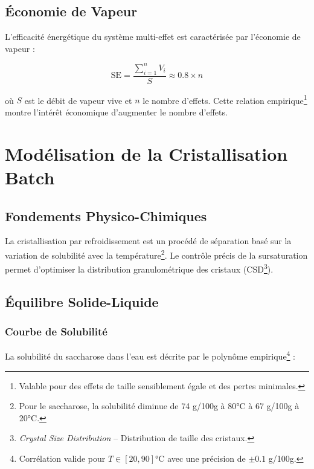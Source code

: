 \documentclass[12pt,a4paper,twoside]{article}
\begin{document}
\subsection{Économie de Vapeur}

L'efficacité énergétique du système multi-effet est caractérisée par l'économie de vapeur :

\begin{equation}
\boxed{\text{SE} = \frac{\sum_{i=1}^{n} V_i}{S} \approx 0.8 \times n}
\label{eq:steam_economy}
\end{equation}

où $S$ est le débit de vapeur vive et $n$ le nombre d'effets. Cette relation empirique\footnote{Valable pour des effets de taille sensiblement égale et des pertes minimales.} montre l'intérêt économique d'augmenter le nombre d'effets.

\section{Modélisation de la Cristallisation Batch}

\subsection{Fondements Physico-Chimiques}

\lettrine[lines=2]{L}{}a cristallisation par refroidissement est un procédé de séparation basé sur la variation de solubilité avec la température\footnote{Pour le saccharose, la solubilité diminue de 74 g/100g à 80°C à 67 g/100g à 20°C.}. Le contrôle précis de la sursaturation permet d'optimiser la distribution granulométrique des cristaux (CSD\footnote{\textit{Crystal Size Distribution} -- Distribution de taille des cristaux.}).

\subsection{Équilibre Solide-Liquide}

\subsubsection{Courbe de Solubilité}

La solubilité du saccharose dans l'eau est décrite par le polynôme empirique\footnote{Corrélation valide pour $T \in [20, 90]$°C avec une précision de $\pm 0.1$ g/100g.} :
\end{document}
